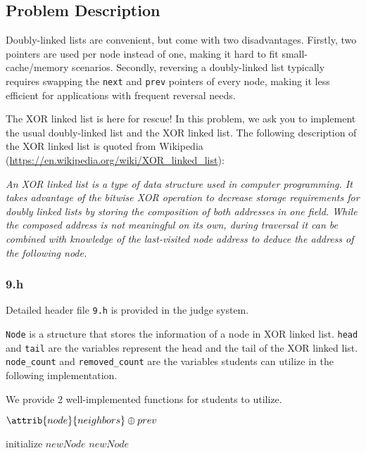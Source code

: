 \setcounter{secnumdepth}{0}

\subsection{Problem Description}\label{problem-description}

Doubly-linked lists are convenient, but come with two disadvantages. Firstly, two pointers are used per node instead of one, making it hard to fit small-cache/memory scenarios. Secondly, reversing a doubly-linked list typically requires swapping the \texttt{next} and \texttt{prev} pointers of every node, making it less efficient for applications with frequent reversal needs.

The XOR linked list is here for rescue! In this problem, we ask you to implement the usual doubly-linked list and the XOR linked list. The following description of the XOR linked list is quoted from Wikipedia (\url{https://en.wikipedia.org/wiki/XOR_linked_list}): 

{\it
An XOR linked list is a type of data structure used in computer programming. It takes advantage of the bitwise XOR operation to decrease storage requirements for doubly linked lists by storing the composition of both addresses in one field. While the composed address is not meaningful on its own, during traversal it can be combined with knowledge of the last-visited node address to deduce the address of the following node.
}

\subsubsection{9.h}\label{9.h}

Detailed header file \texttt{9.h} is provided in the judge system.

\noindent \texttt{Node} is a structure that stores the information of a node in XOR linked list. \texttt{head} and \texttt{tail} are the variables represent the head and the tail of the XOR linked list. \texttt{node\_count} and \texttt{removed\_count} are the variables students can utilize in the following implementation.

We provide 2 well-implemented functions for students to utilize.

\begin{codebox}
\li \Return $\attrib{node}{neighbors} \oplus prev$
\End
\end{codebox}

\begin{codebox}
\li initialize $newNode$
\li \Return $newNode$
\End
\end{codebox}

